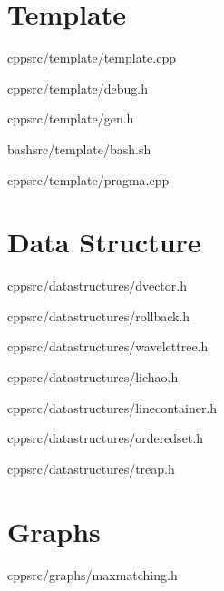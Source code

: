 \documentclass[portrait, 8pt, a4paper, oneside, twocolumn]{extarticle}
\begin{document}
\maketitlepage


\noindent\hrulefill

    \section{Template}

    {}
    {}
    {cpp}{src/template/template.cpp}
    \noindent\hrulefill

    {}
    {}
    {cpp}{src/template/debug.h}
    \noindent\hrulefill

    {}
    {}
    {cpp}{src/template/gen.h}
    \noindent\hrulefill

    {}
    {}
    {bash}{src/template/bash.sh}
    \noindent\hrulefill

    {}
    {}
    {cpp}{src/template/pragma.cpp}
    \noindent\hrulefill

\section{Data Structure}
    {}
    {}
    {cpp}{src/datastructures/dvector.h}
    \noindent\hrulefill

    {}
    {}
    {cpp}{src/datastructures/rollback.h}
    \noindent\hrulefill

    {}
    {}
    {cpp}{src/datastructures/wavelettree.h}
    \noindent\hrulefill

    {}
    {}
    {cpp}{src/datastructures/lichao.h}
    \noindent\hrulefill

    {}
    {}
    {cpp}{src/datastructures/linecontainer.h}
    \noindent\hrulefill

    {}
    {}
    {cpp}{src/datastructures/orderedset.h}
    \noindent\hrulefill

    {}
    {}
    {cpp}{src/datastructures/treap.h}
    \noindent\hrulefill

\section{Graphs}
    {}
    {}
    {cpp}{src/graphs/maxmatching.h}
    \noindent\hrulefill
\end{document}
